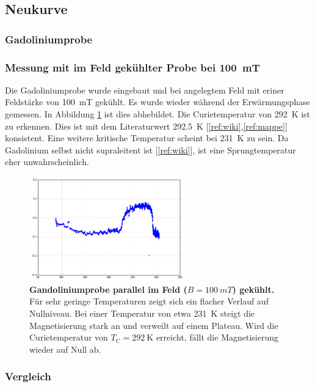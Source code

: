 \documentclass[a4paper,ngerman]{scrartcl}
\begin{document}
\subsection{Neukurve}


\subsubsection{Gadoliniumprobe}

\subsubsection*{Messung mit im Feld gekühlter Probe bei \SI{100}{mT}}

Die Gadoliniumprobe wurde eingebaut und bei angelegtem Feld mit eriner Feldstärke von \SI{100}{mT} gekühlt.
Es wurde wieder während der Erwärmungsphase gemessen.
In Abbildung \ref{fig:Gandolinium} ist dies abhebildet.
Die Curietemperatur von \SI{292}{\K} ist zu erkennen.
Dies ist mit dem Literaturwert \SI{292.5}{\K} [\ref{ref:wiki},\ref{ref:mappe}] konsistent.
Eine weitere kritische Temperatur scheint bei \SI{231}{\K} zu sein.
Da Gadolinium selbst nicht supraleitent ist [\ref{ref:wiki}], ist eine Sprungtemperatur eher unwahrscheinlich.

\begin{figure}
\centering
\includegraphics[width=0.6\textwidth]{abbildungen/gadolinium.png}
\caption[Gandolinium]{\textbf{Gandoliniumprobe parallel im Feld ($B = \SI{100}{mT}$) gekühlt.} 
Für sehr geringe Temperaturen zeigt sich ein flacher Verlauf auf Nullniveau.
Bei einer Temperatur von etwa \SI{231}{\K} steigt die Magnetisierung stark an und verweilt auf einem Plateau.
Wird die Curietemperatur von $T_{\mathrm{C}} = \SI{292}{\K}$ erreicht, fällt die Magnetisierung wieder auf Null ab.
} 
\label{fig:Gandolinium}
\end{figure}



\subsubsection{Vergleich}
\end{document}
